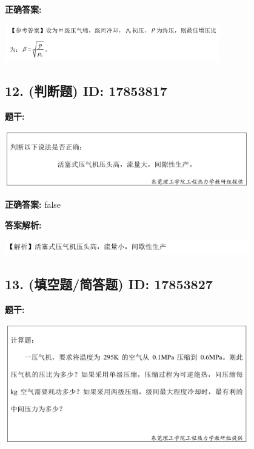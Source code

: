 \documentclass[12pt]{article}
\begin{document}
\textbf{正确答案:}

\begin{center}\includegraphics[width=0.7\textwidth, height=0.2\textheight, keepaspectratio]{question_11_17853824/correct_answer_1_img_1.png}\end{center}

\vspace{0.5em}\hrulefill\vspace{1em}

\subsection*{12. (判断题) \small ID: 17853817}

\textbf{题干:}


\begin{center}\includegraphics[width=0.8\textwidth, height=0.25\textheight, keepaspectratio]{question_12_17853817/title_img_1.png}\end{center}

\textbf{正确答案:}
false

\textbf{答案解析:}


\begin{center}\includegraphics[width=0.8\textwidth, height=0.25\textheight, keepaspectratio]{question_12_17853817/correct_replay_img_1.png}\end{center}

\vspace{0.5em}\hrulefill\vspace{1em}

\subsection*{13. (填空题/简答题) \small ID: 17853827}

\textbf{题干:}


\begin{center}\includegraphics[width=0.8\textwidth, height=0.25\textheight, keepaspectratio]{question_13_17853827/title_img_1.png}\end{center}
\end{document}
